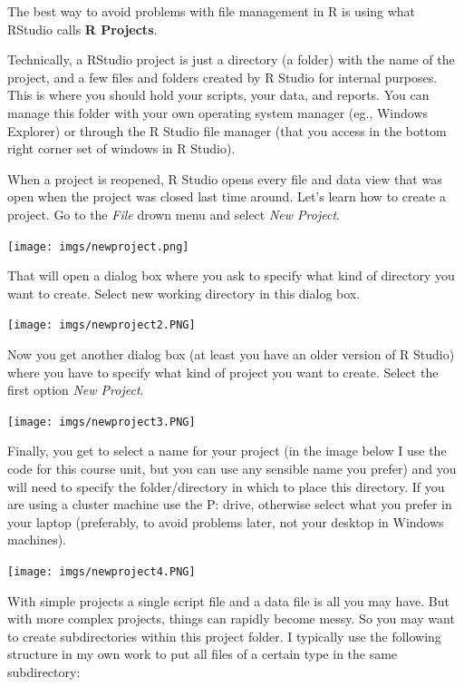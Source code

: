 \documentclass[
]{book}
\begin{document}
The best way to avoid problems with file management in R is using what RStudio calls \textbf{R Projects}.

Technically, a RStudio project is just a directory (a folder) with the name of the project, and a few files and folders created by R Studio for internal purposes. This is where you should hold your scripts, your data, and reports. You can manage this folder with your own operating system manager (eg., Windows Explorer) or through the R Studio file manager (that you access in the bottom right corner set of windows in R Studio).

When a project is reopened, R Studio opens every file and data view that was open when the project was closed last time around. Let's learn how to create a project. Go to the \emph{File} drown menu and select \emph{New Project}.

\texttt{[image: imgs/newproject.png]}

That will open a dialog box where you ask to specify what kind of directory you want to create. Select new working directory in this dialog box.

\texttt{[image: imgs/newproject2.PNG]}

Now you get another dialog box (at least you have an older version of R Studio) where you have to specify what kind of project you want to create. Select the first option \emph{New Project}.

\texttt{[image: imgs/newproject3.PNG]}

Finally, you get to select a name for your project (in the image below I use the code for this course unit, but you can use any sensible name you prefer) and you will need to specify the folder/directory in which to place this directory. If you are using a cluster machine use the P: drive, otherwise select what you prefer in your laptop (preferably, to avoid problems later, not your desktop in Windows machines).

\texttt{[image: imgs/newproject4.PNG]}

With simple projects a single script file and a data file is all you may have. But with more complex projects, things can rapidly become messy. So you may want to create subdirectories within this project folder. I typically use the following structure in my own work to put all files of a certain type in the same subdirectory:
\end{document}
